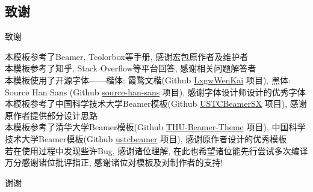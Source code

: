 \documentclass[hyperref,UTF8,11pt,CJK]{beamer}
\begin{document}
\subsection{致谢}
\begin{frame}{致谢}
	\begin{center}
		本模板参考了Beamer, Tcolorbox等手册, 感谢宏包原作者及维护者\\[1ex]
		本模板参考了知乎, Stack Overflow等平台回答, 感谢相关问题解答者\\[1ex]
		本模板使用了开源字体——楷体: 霞鹜文楷(Github \href{https://github.com/lxgw/LxgwWenKai/}{\color{scublue}LxgwWenKai} 项目), 黑体: Source Han Sans (Github \href{https://github.com/adobe-fonts/source-han-sans/}{\color{scublue}source-han-sans} 项目), 感谢字体设计师设计的优秀字体\\[1ex]
		本模板参考了中国科学技术大学Beamer模板(Github \href{https://github.com/ysx2000/USTCBeamerSX/}{\color{scublue}USTCBeamerSX} 项目), 感谢原作者提供部分设计思路\\[1ex]
		本模板参考了清华大学Beamer模板(Github \href{https://github.com/tuna/THU-Beamer-Theme/}{\color{scublue}THU-Beamer-Theme} 项目), 中国科学技术大学Beamer模板(Github \href{https://github.com/ustctug/ustcbeamer/}{\color{scublue}ustcbeamer} 项目), 感谢原作者设计的优秀模板\\[1ex]
		
		若在使用过程中发现些许Bug, 感谢诸位理解, 在此也希望诸位能先行尝试多次编译\\[1ex]
		万分感谢诸位批评指正, 感谢诸位对模板及对制作者的支持!
	\end{center}
\end{frame}

\begin{frame}{}
	\centering
	\Huge 谢谢
\end{frame}
\end{document}
